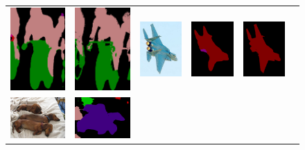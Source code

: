 \begin{figure}[!htbp]
{\begin{tabular}{c c c | c c c}
    \includegraphics[height=0.24\linewidth]{fig/res_none/2007_000129.png} &
    \includegraphics[height=0.24\linewidth]{fig/res_crf/2007_000129.png} &
    \includegraphics[height=0.24\linewidth]{fig/img/2007_002619.jpg} &
    \includegraphics[height=0.24\linewidth]{fig/res_none/2007_002619.png} &
    \includegraphics[height=0.24\linewidth]{fig/res_crf/2007_002619.png} \\
    \includegraphics[height=0.12\linewidth]{fig/img/2007_002852.jpg} &
    \includegraphics[height=0.12\linewidth]{fig/res_none/2007_002852.png} &

\end{tabular}}
\end{figure}
